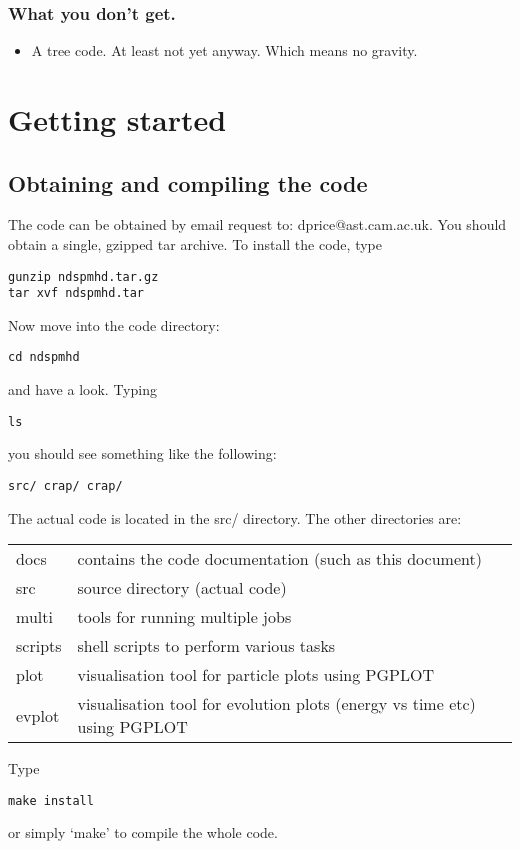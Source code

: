 \documentclass[a4paper,12pt]{article}
\begin{document}
\subsubsection{What you don't get.}
\begin{itemize}
\item A tree code. At least not yet anyway. Which means no gravity.
\end{itemize}

\section{Getting started}

\subsection{Obtaining and compiling the code}
The code can be obtained by email request to: dprice@ast.cam.ac.uk. You
should obtain a single, gzipped tar archive. To install the code, type
\begin{verbatim}
gunzip ndspmhd.tar.gz
tar xvf ndspmhd.tar
\end{verbatim}
Now move into the code directory:
\begin{verbatim}
cd ndspmhd
\end{verbatim}
and have a look. Typing
\begin{verbatim}
ls
\end{verbatim}
 you should see something like the following:
\begin{verbatim}
src/ crap/ crap/
\end{verbatim}
The actual code is located in the src/ directory. The other
directories are:
\begin{tabular}{ll}
docs & contains the code documentation (such as this document) \\
src & source directory (actual code)\\
multi & tools for running multiple jobs\\
scripts & shell scripts to perform various tasks\\
plot & visualisation tool for particle plots using PGPLOT \\
evplot & visualisation tool for evolution plots (energy vs time etc) using
PGPLOT
\end{tabular}
Type
\begin{verbatim}
make install
\end{verbatim}
or simply `make' to compile the whole
code. 
\end{document}
